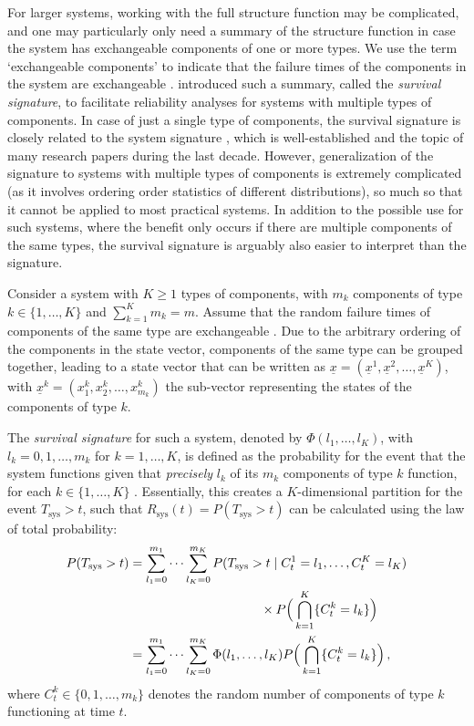 \documentclass[12pt, a4paper]{elsarticle}
\newcommand{\Rsys}{R_\text{sys}}
\def\Tsys{T_\text{sys}}
\begin{document}
For larger systems, working with the full structure function may be complicated, and one may particularly
only need a summary of the structure function in case the system has exchangeable components of one or more
types. We use the term `exchangeable components' to indicate that the failure times of the components in the system
are exchangeable \citep{DF74}. \citet{2012:survsign} introduced such a summary,
called the \emph{survival signature}, 
to facilitate reliability analyses for systems with multiple types of components. In case of just a single type of components, 
the survival signature is closely related to the system signature \citep{Sa07}, which is well-established and the topic of many
research papers during the last decade. However, generalization of the signature to systems with
multiple types of components is extremely complicated (as it involves ordering order statistics of different
distributions), so much so that it cannot be applied to most practical systems. In addition to the 
possible use for such systems, where the benefit only occurs if there are multiple components of the 
same types, the survival signature is arguably also easier to interpret than the signature. 

Consider a system with $K\ge 1$ types of components, with $m_k$ components of type $k \in \{1,\ldots,K\}$ and 
$\sum_{k=1}^K m_k = m$. Assume that the random failure times of components of the same type are exchangeable \citep{DF74}.
Due to the arbitrary ordering of the components in the state vector, components of the same type can be grouped together, 
leading to a state vector that can be written as 
$\underline{x} = (\underline{x}^1,\underline{x}^2,\ldots,\underline{x}^K)$, with 
$\underline{x}^k = (x^k_1,x^k_2,\ldots,x^k_{m_k})$ the sub-vector representing the states of the components of type $k$. 

The \emph{survival signature} for such a system, denoted by $\Phi(l_1,\ldots,l_K)$, with $l_k=0,1,\ldots,m_k$ 
for $k=1,\ldots,K$, is defined as the probability for the event that the system functions given that \emph{precisely} $l_k$ of its 
$m_k$ components of type $k$ function, for each $k\in \{1,\ldots,K\}$ \citep{2012:survsign}.
Essentially, this creates a $K$-dimensional partition for the event $\Tsys > t$, such that $\Rsys(t) = P(\Tsys > t)$
can be calculated using the law of total probability:
\begin{align}
\label{eq:rsyswithsurvsign}
P(\Tsys > t)
 &= \sum_{l_1=0}^{m_1} \cdots \sum_{l_K=0}^{m_K} P(\Tsys > t \mid C^1_t = l_1,\ldots, C^K_t = l_K) \nonumber\\
 &  \hspace*{24ex}                        \times P\Big( \bigcap_{k=1}^K \{ C^k_t = l_k\} \Big) \nonumber\\
 &= \sum_{l_1=0}^{m_1} \cdots \sum_{l_K=0}^{m_K} \Phi(l_1, \ldots, l_K)
                                                 P\Big( \bigcap_{k=1}^K \{ C^k_t = l_k\} \Big) \,,
\end{align}
where $C^k_t \in \{0, 1, \ldots, m_k\}$ denotes
the random number of components of type $k$ functioning at time $t$. 
\end{document}
